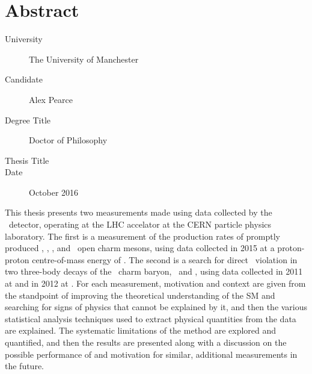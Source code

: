 \chapter{Abstract}

\begin{SingleSpace}

\begin{description}
  \item[University] The University of Manchester
  \item[Candidate] Alex Pearce
  \item[Degree Title] Doctor of Philosophy
  \item[Thesis Title] \thetitle
  \item[Date] October 2016
\end{description}

This thesis presents two measurements made using data collected by the \lhcb\ 
detector, operating at the \acl{LHC} accelator at the CERN particle physics 
laboratory.
The first is a measurement of the production rates of promptly produced 
\PDzero, \PDplus, \PDsplus, and \PDstarp\ open charm mesons, using data 
collected in 2015 at a proton-proton centre-of-mass energy of .
The second is a search for direct \CP\ violation in two three-body decays of 
the \PLambdac\ charm baryon, \pKK\ and \ppipi, using data collected in 2011 at 
\sqrtseq{7} and in 2012 at \sqrtseq{8}.
For each measurement, motivation and context are given from the standpoint of 
improving the theoretical understanding of the \acl{SM} and searching for signs 
of physics that cannot be explained by it, and then the various statistical 
analysis techniques used to extract physical quantities from the data are 
explained.
The systematic limitations of the method are explored and quantified, and then 
the results are presented along with a discussion on the possible performance 
of and motivation for similar, additional measurements in the future.

\end{SingleSpace}
